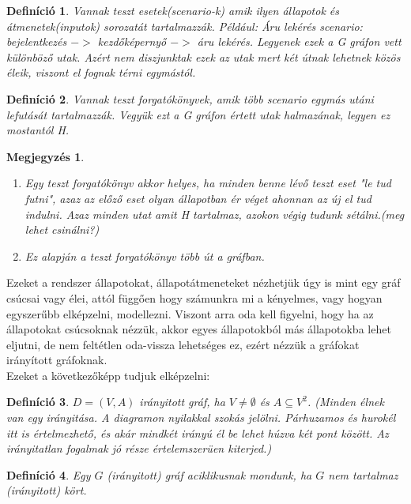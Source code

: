 \documentclass[12pt]{article}
\newtheorem{defin}{Definíció}[section]
\newtheorem{megj}{Megjegyzés}[section]
\begin{document}
\begin{defin}
Vannak teszt esetek(scenario-k) amik ilyen állapotok és átmenetek(inputok) sorozatát tartalmazzák. Például: Áru lekérés scenario:  bejelentkezés $->$ kezdőképernyő $->$ áru lekérés. Legyenek ezek a G gráfon vett különböző utak. Azért nem diszjunktak ezek az utak mert két útnak lehetnek közös éleik, viszont el fognak térni egymástól.
\end{defin}

\begin{defin}
Vannak teszt forgatókönyvek, amik több scenario egymás utáni lefutását tartalmazzák. Vegyük ezt a G gráfon értett utak halmazának, legyen ez mostantól H.
\end{defin}

\begin{megj}
\begin{enumerate}
\item Egy teszt forgatókönyv akkor helyes, ha minden benne lévő teszt eset "le tud futni", azaz az előző eset olyan állapotban ér véget ahonnan az új el tud indulni. Azaz minden utat amit H tartalmaz, azokon végig tudunk sétálni.(meg lehet csinálni?)
\item Ez alapján a teszt forgatókönyv több út a gráfban.
\end{enumerate}
\end{megj}

Ezeket a rendszer állapotokat, állapotátmeneteket nézhetjük úgy is mint egy gráf csúcsai vagy élei, attól függően hogy számunkra mi a kényelmes, vagy hogyan egyszerűbb elképzelni, modellezni.
Viszont arra oda kell figyelni, hogy ha az állapotokat csúcsoknak nézzük, akkor egyes állapotokból más állapotokba lehet eljutni, de nem feltétlen oda-vissza lehetséges ez, ezért nézzük a gráfokat irányított gráfoknak.\\
Ezeket a következőképp tudjuk elképzelni:

\begin{defin}
$D = (V,A)$ irányitott gráf, ha $V \neq \emptyset$ és $A \subseteq V^2$. (Minden élnek van egy irányitása. A diagramon nyilakkal szokás jelölni. Párhuzamos és hurokél itt is értelmezhető, és akár mindkét irányú él be lehet húzva két pont között. Az irányitatlan fogalmak jó része értelemszerüen kiterjed.) ~\cite{szam:Fleiner}
\end{defin}

\begin{defin}
Egy $G$ (irányitott) gráf aciklikusnak mondunk, ha $G$ nem tartalmaz (irányitott) kört. ~\cite{szam:Fleiner}
\end{defin}
\end{document}
